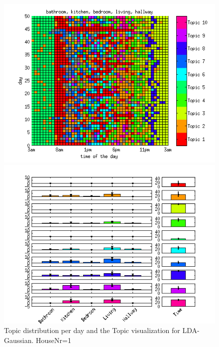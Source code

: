 \begin{figure}
 \centering
 \begin{minipage}[b]{0.45\linewidth}
  \centering
  \includegraphics[width=\textwidth]{Pictures/Gaus/DayHN1TS48k20.png}
 \end{minipage}
 \begin{minipage}[b]{0.45\linewidth}
  \centering
  \includegraphics[width=\textwidth]{Pictures/Gaus/TopHN1TS48k20.png}
 \end{minipage}
 \caption{Topic distribution per day and the Topic visualization for LDA-Gaussian. HouseNr=1}
\end{figure}

